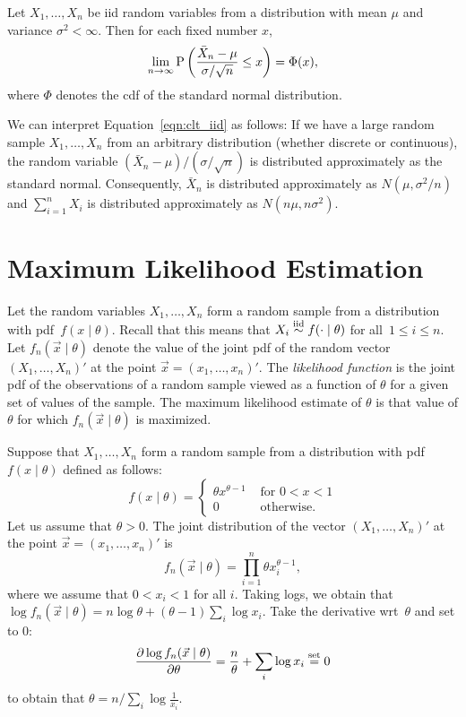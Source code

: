 \begin{theorem}
Let $X_1, \ldots, X_n$ be iid random variables from a distribution with mean $\mu$
and variance $\sigma^2 < \infty$. Then for each fixed number $x$,
\begin{equation} \label{eqn:clt_iid}
\lim_{n \to \infty} \operatorname{P} \left ( \frac{\bar{X}_n - \mu}{\sigma / \sqrt{n} } \leq x \right ) = \Phi (x),
\end{equation} 
where $\Phi$ denotes the cdf of the standard normal distribution.
\end{theorem}
We can interpret Equation~\ref{eqn:clt_iid} as follows: If we have a large 
random sample $X_1, \ldots, X_n$ from an arbitrary distribution (whether 
discrete or continuous), the random variable $(\bar{X}_n - \mu) / (\sigma / \sqrt{n})$ 
is distributed approximately as the standard normal. Consequently, $\bar{X}_n$ 
is distributed approximately as $N(\mu, \sigma^2 / n)$ and $\sum_{i = 1}^n X_i$ 
is distributed approximately as $N(n \mu, n \sigma^2)$.

\section{Maximum Likelihood Estimation}
Let the random variables $X_1, \ldots, X_n$ form a random sample from a 
distribution with pdf~$f(x \mid \theta)$. Recall that this means that 
$X_i \stackrel{\text{iid}}{\sim} f( \cdot \mid \theta)$ for all~$1 \leq i \leq n$. 
Let $f_n(\vec{x} \mid \theta)$ denote the value of the joint pdf of 
the random vector $(X_1, \ldots, X_n)'$ at the point 
$\vec{x} = (x_1, \ldots, x_n)'$. The \emph{likelihood function} is the joint pdf 
of the observations of a random sample viewed as a function of $\theta$ for 
a given set of values of the sample. The maximum likelihood estimate of 
$\theta$ is that value of $\theta$ for which $f_n (\vec{x} \mid \theta)$ is 
maximized. 
\begin{example}
Suppose that $X_1, \ldots, X_n$ form a random sample from a distribution with 
pdf $f(x \mid \theta)$ defined as follows:
\[
    f(x \mid \theta) = 
        \left \{
            \begin{array}{ll}
                \theta x^{\theta - 1} & \text{ for } 0 < x < 1 \\
                0                     & \text{ otherwise}.
            \end{array} 
        \right .
\]
Let us assume that $\theta > 0$. The joint distribution of the vector 
$(X_1, \ldots, X_n)'$ at the point $\vec{x} = (x_1, \ldots, x_n)'$ is 
\[
    f_n (\vec{x} \mid \theta ) = \prod_{i = 1}^n \theta x_i^{\theta - 1},
\]
where we assume that $0 < x_i < 1$ for all $i$. Taking logs, we obtain that
$\log f_n (\vec{x} \mid \theta) = n \log \theta + (\theta - 1) \sum_i \log x_i$. 
Take the derivative wrt~$\theta$ and set to $0$:
\[
    \frac{\partial \log f_n (\vec{x} \mid \theta)}{\partial \theta} = 
        \frac{n}{\theta} + \sum_i \log x_i \stackrel{\text{set}}{=} 0
\]
to obtain that $\theta = n / \sum_i \log \frac{1}{x_i}$.
\eop 
\end{example}   

